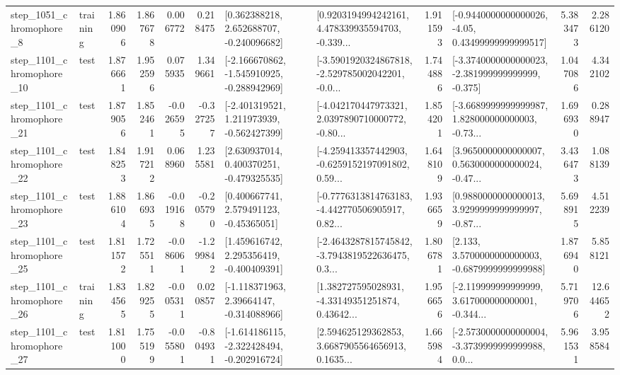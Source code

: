 \begin{tabular}{llrrrrllrlrr}
  step\_1051\_chromophore\_8 &  training &      1.860906 &    1.867678 &      0.006772 &  0.218475 &    [0.362388218, 2.652688707, -0.240096682] &  [0.9203194994242161, 4.478339935594703, -0.339... &       1.911593 &  [-0.9440000000000026, -4.05, 0.43499999999999517] &            5.383473 &          2.286120 \\
 step\_1101\_chromophore\_10 &      test &      1.876661 &    1.952596 &      0.075935 &  1.349661 &  [-2.166670862, -1.545910925, -0.288942969] &  [-3.5901920324867818, -2.529785002042201, -0.0... &       1.744886 &  [-3.3740000000000023, -2.381999999999999, -0.375] &            1.047086 &          4.342102 \\
 step\_1101\_chromophore\_21 &      test &      1.879056 &    1.852461 &     -0.026595 & -0.327257 &   [-2.401319521, 1.211973939, -0.562427399] &  [-4.042170447973321, 2.0397890710000772, -0.80... &       1.854201 &  [-3.6689999999999987, 1.828000000000003, -0.73... &            1.696930 &          0.288947 \\
 step\_1101\_chromophore\_22 &      test &      1.848253 &    1.917212 &      0.068960 &  1.235581 &    [2.630937014, 0.400370251, -0.479325535] &  [-4.259413357442903, -0.6259152197091802, 0.59... &       1.648109 &  [3.9650000000000007, 0.5630000000000024, -0.47... &            3.436473 &          1.088139 \\
 step\_1101\_chromophore\_23 &      test &      1.886104 &    1.866935 &     -0.019168 & -0.205790 &     [0.400667741, 2.579491123, -0.45365051] &  [-0.7776313814763183, -4.442770506905917, 0.82... &       1.936659 &  [0.9880000000000013, 3.9299999999999997, -0.87... &            5.698915 &          4.512239 \\
 step\_1101\_chromophore\_25 &      test &      1.811572 &    1.725511 &     -0.086061 & -1.299842 &    [1.459616742, 2.295356419, -0.400409391] &  [-2.4643287815745842, -3.7943819522636475, 0.3... &       1.806781 &   [2.133, 3.5700000000000003, -0.6879999999999988] &            1.876940 &          5.858121 \\
 step\_1101\_chromophore\_26 &  training &      1.834565 &    1.829255 &     -0.005311 &  0.020857 &    [-1.118371963, 2.39664147, -0.314088966] &  [1.382727595028931, -4.33149351251874, 0.43642... &       1.956656 &  [-2.119999999999999, 3.617000000000001, -0.344... &            5.719706 &         12.644652 \\
 step\_1101\_chromophore\_27 &      test &      1.811000 &    1.755199 &     -0.055801 & -0.804931 &  [-1.614186115, -2.322428494, -0.202916724] &  [2.594625129362853, 3.6687905564656913, 0.1635... &       1.665984 &  [-2.5730000000000004, -3.3739999999999988, 0.0... &            5.961531 &          3.958584 \\

\end{tabular}
